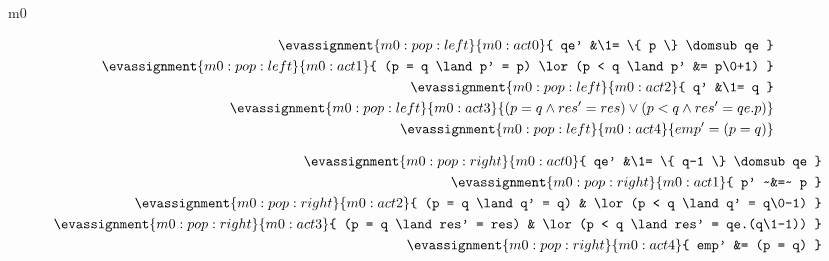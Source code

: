 \documentclass[12pt]{amsart}
\begin{document}
\begin{machine}{m0}

\begin{align*}
\evassignment{m0:pop:left}{m0:act0}
	{ qe' &\1= \{ p \} \domsub qe }
\\ \evassignment{m0:pop:left}{m0:act1}
	{ (p = q \land p' = p) \lor (p < q \land p' &= p\0+1) }
\\ \evassignment{m0:pop:left}{m0:act2}
	{ q' &\1= q }
\\ \evassignment{m0:pop:left}{m0:act3}
	{ (p = q \land res' = res) \lor (p < q \land res' = qe.p) }
\\ \evassignment{m0:pop:left}{m0:act4}
	{ emp' = (p = q) }
\end{align*}


\begin{align*}
\evassignment{m0:pop:right}{m0:act0}{ qe' &\1= \{ q-1 \} \domsub qe }
\\ \evassignment{m0:pop:right}{m0:act1}{ p' ~&=~ p }
\\ \evassignment{m0:pop:right}{m0:act2}{ (p = q \land q' = q) & \lor (p < q \land q' = q\0-1) }
\\ \evassignment{m0:pop:right}{m0:act3}{ (p = q \land res' = res) & \lor (p < q \land res' = qe.(q\1-1)) }
\\ \evassignment{m0:pop:right}{m0:act4}{ emp' &= (p = q) }
\end{align*}



\end{machine}

\newcommand{\REQ}{\text{Req}}
\end{document}
